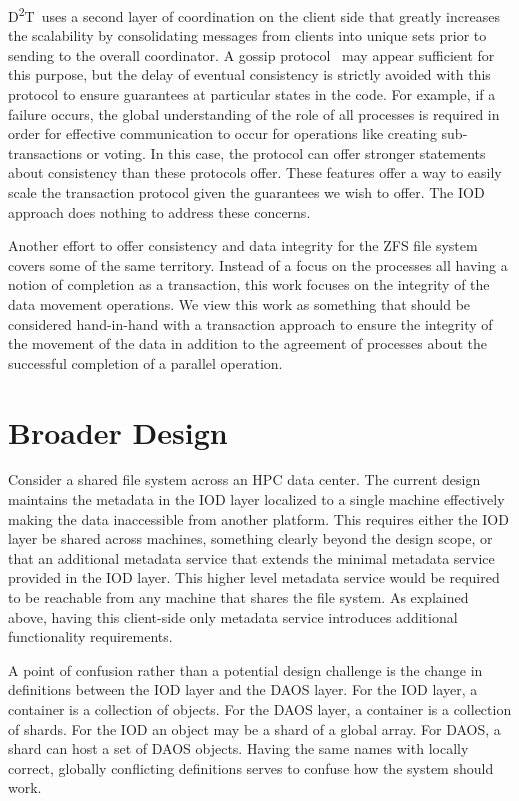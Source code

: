 \documentclass[conference]{sig-alt-gov2}
\newcommand{\DDT}{D\textsuperscript{2}T~}
\begin{document}
\DDT uses a second layer of coordination on the client side that greatly
increases the scalability by consolidating messages from clients into unique
sets prior to sending to the overall coordinator. A gossip
protocol~\cite{ganesh:2003:gossip-protocols} may appear sufficient for this
purpose, but the delay of eventual consistency is strictly avoided with this
protocol to ensure guarantees at particular states in the code. For example, if
a failure occurs, the global understanding of the role of all processes is
required in order for effective communication to occur for operations like
creating sub-transactions or voting. In this case, the protocol can offer
stronger statements about consistency than these protocols offer.  These
features offer a way to easily scale the transaction protocol given the
guarantees we wish to offer. The IOD approach does nothing to address these
concerns.

Another effort to offer consistency and data integrity for the ZFS file
system~\cite{zhang:2010:zfs} covers some of the same territory. Instead of a
focus on the processes all having a notion of completion as a transaction, this
work focuses on the integrity of the data movement operations. We view this
work as something that should be considered hand-in-hand with a transaction
approach to ensure the integrity of the movement of the data in addition to the
agreement of processes about the successful completion of a parallel operation.

\section{Broader Design}
\label{sec:summary}

Consider a shared file system across an HPC data center. The current design
maintains the metadata in the IOD layer localized to a single machine
effectively making the data inaccessible from another platform. This requires
either the IOD layer be shared across machines, something clearly beyond the
design scope, or that an additional metadata service that extends the minimal
metadata service provided in the IOD layer. This higher level metadata service
would be required to be reachable from any machine that shares the file system.
As explained above, having this client-side only metadata service introduces
additional functionality requirements.

A point of confusion rather than a potential design challenge is the change in
definitions between the IOD layer and the DAOS layer.  For the IOD layer, a
container is a collection of objects. For the DAOS layer, a container is a
collection of shards. For the IOD an object may be a shard of a global array.
For DAOS, a shard can host a set of DAOS objects. Having the same names with
locally correct, globally conflicting definitions serves to confuse how the
system should work.
\end{document}
